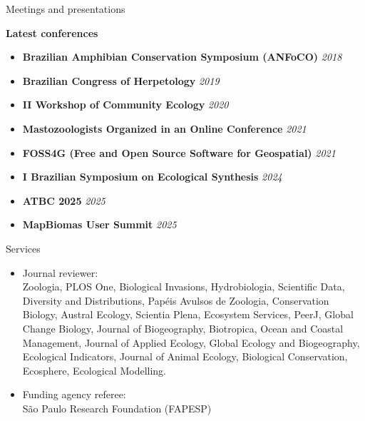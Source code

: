 \documentclass{resume}
\begin{document}
\begin{rSection}{Meetings and presentations}

{\bf Latest conferences}
\begin{itemize}
\item {\bf Brazilian Amphibian Conservation Symposium (ANFoCO)} \hfill{\em 2018}
\item {\bf Brazilian Congress of Herpetology} \hfill{\em 2019}
\item {\bf II Workshop of Community Ecology} \hfill{\em 2020}
\item {\bf Mastozoologists Organized in an Online Conference} \hfill{\em 2021}
\item {\bf FOSS4G (Free and Open Source Software for Geospatial)} \hfill{\em 2021}
\item {\bf I Brazilian Symposium on Ecological Synthesis} \hfill{\em 2024}
\item {\bf ATBC 2025} \hfill{\em 2025}
\item {\bf MapBiomas User Summit} \hfill{\em 2025}
\end{itemize}

\end{rSection}


\begin{rSection}{Services}
\begin{itemize}
\item Journal reviewer:\\
Zoologia, PLOS One, Biological Invasions, Hydrobiologia, Scientific Data, Diversity and Distributions, Papéis Avulsos de Zoologia, Conservation Biology, Austral Ecology, Scientia Plena, Ecosystem Services, PeerJ, Global Change Biology, Journal of Biogeography, Biotropica, Ocean and Coastal Management, Journal of Applied Ecology, Global Ecology and Biogeography, Ecological Indicators, Journal of Animal Ecology, Biological Conservation, Ecosphere, Ecological Modelling.

\item Funding agency referee:\\
São Paulo Research Foundation (FAPESP)
\end{itemize}
\end{rSection}

\end{document}
